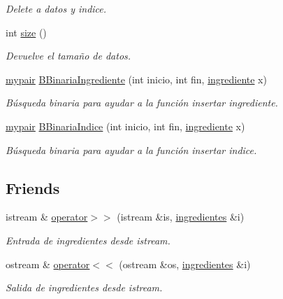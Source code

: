 \begin{DoxyCompactItemize}
\begin{DoxyCompactList}\small\item\em Delete a datos y indice. \end{DoxyCompactList}\item 
int \hyperlink{classingredientes_a642511344976e22479ae78e4ee2917f9}{size} ()
\begin{DoxyCompactList}\small\item\em Devuelve el tamaño de datos. \end{DoxyCompactList}\item 
\hyperlink{structmypair}{mypair} \hyperlink{classingredientes_af54ca9dbd807c345f6f953a2c63172de}{B\+Binaria\+Ingrediente} (int inicio, int fin, \hyperlink{classingrediente}{ingrediente} x)
\begin{DoxyCompactList}\small\item\em Búsqueda binaria para ayudar a la función insertar ingrediente. \end{DoxyCompactList}\item 
\hyperlink{structmypair}{mypair} \hyperlink{classingredientes_abfbdb4c010ef4a72c750a077645eb4f0}{B\+Binaria\+Indice} (int inicio, int fin, \hyperlink{classingrediente}{ingrediente} x)
\begin{DoxyCompactList}\small\item\em Búsqueda binaria para ayudar a la función insertar indice. \end{DoxyCompactList}\end{DoxyCompactItemize}
\subsection*{Friends}
\begin{DoxyCompactItemize}
\item 
istream \& \hyperlink{classingredientes_a1ab0c9c6bff343a083f9cf9296b31438}{operator$>$$>$} (istream \&is, \hyperlink{classingredientes}{ingredientes} \&i)
\begin{DoxyCompactList}\small\item\em Entrada de ingredientes desde istream. \end{DoxyCompactList}\item 
ostream \& \hyperlink{classingredientes_a9516ae2a429fa3af5b8d59b98a285c86}{operator$<$$<$} (ostream \&os, \hyperlink{classingredientes}{ingredientes} \&i)
\begin{DoxyCompactList}\small\item\em Salida de ingredientes desde istream. \end{DoxyCompactList}\end{DoxyCompactItemize}


